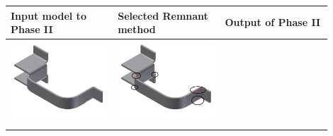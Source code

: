 \begin{minipage}[t]{\linewidth}
\begin{tabular}[h]{@{} p{0.3\linewidth} p{0.3\linewidth}  p{0.3\linewidth}@{}} \toprule

\textbf{Input model to Phase II} & \textbf{Selected Remnant method} & \textbf{Output of Phase II} \\ \midrule


\includegraphics[width=0.98\linewidth]{..//Common/images/DefeatBracketPhase_I_3} &
\includegraphics[width=0.98\linewidth]{..//Common/images/DefeatBracketPhase_II_2_circled} &

\end{tabular}
\end{minipage}
